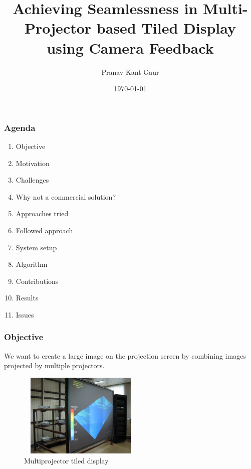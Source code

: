 \documentclass{beamer}
\title{Achieving Seamlessness in Multi-Projector based Tiled Display using Camera Feedback}
\author{Pranav Kant Gaur}
\institute{Graphics and Visualization section}
\date{\today}
\begin{document}
\begin{frame}
\titlepage
\end{frame}





\begin{frame}
\frametitle{Agenda}
\begin{enumerate}
\item Objective 
\item Motivation
\item Challenges
\item Why not a commercial solution?
\item Approaches tried
\item Followed approach
\item System setup
\item Algorithm 
\item Contributions
\item Results
\item Issues
\end{enumerate}
\end{frame}

\begin{frame}
\frametitle{Objective}
We want to create a large image on the projection screen by combining images projected by multiple projectors.

\begin{figure}
\includegraphics[width=6.0cm,height=4cm]{figures/system_setup.jpg}
\caption{Multiprojector tiled display}
\end{figure}

\end{frame}
\end{document}
